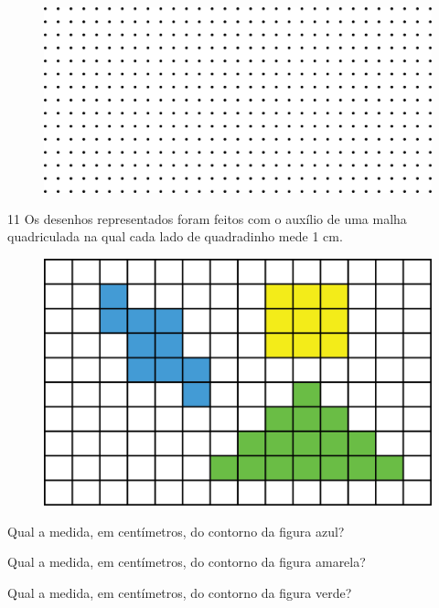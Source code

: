 \begin{figure}[htpb!]
\includegraphics[width=\textwidth]{./media/image58.png}
\end{figure}


\num{11} Os desenhos representados foram feitos com o auxílio de uma malha
quadriculada na qual cada lado de quadradinho mede 1 cm.\enlargethispage{3\baselineskip}

\begin{figure}[htpb!]
\includegraphics[width=\textwidth]{./media/image57.png}
\end{figure}
\pagebreak

\begin{escolha}
\item Qual a medida, em centímetros, do contorno da figura azul?\\
\reduline{18 cm\hfill}

\item Qual a medida, em centímetros, do contorno da figura amarela?\\
\reduline{12 cm\hfill}

\item Qual a medida, em centímetros, do contorno da figura verde?\\
\reduline{22 cm\hfill}
\end{escolha}


